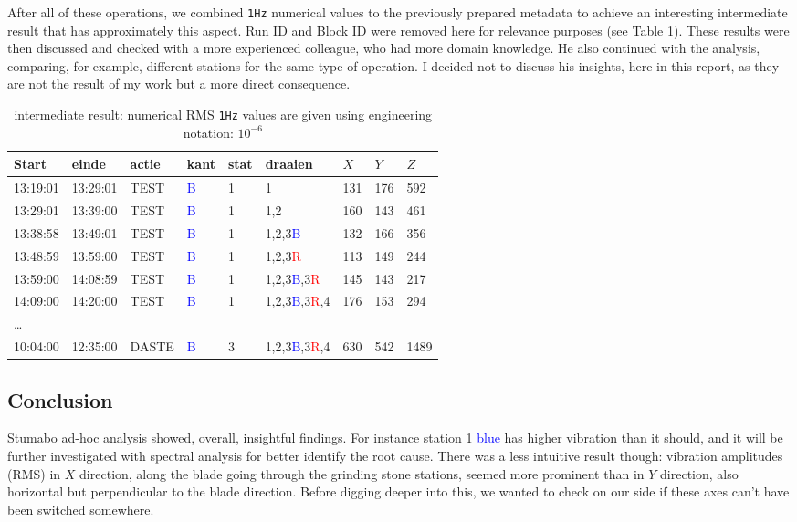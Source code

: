 After all of these operations, we combined \texttt{1Hz} numerical values to the previously prepared metadata to achieve an interesting intermediate result that has approximately this aspect. 
Run ID and Block ID were removed here for relevance purposes (see Table \ref{tab:stu_intermediate_res}).  
These results were then discussed and checked with a more experienced colleague, who had more domain knowledge. 
He also continued with the analysis, comparing, for example, different stations for the same type of operation. 
I decided not to discuss his insights, here in this report, as they are not the result of my work but a more direct consequence.
\begin{table}[ht]
    \centering
    \begin{tabularx}{\textwidth}{@{}lllllllll@{}}
    \toprule
    Start & einde & actie & kant & stat & draaien & $X$ & $Y$ & $Z$ \\ \midrule
    13:19:01 & 13:29:01 & TEST & \textcolor{blue}{B} & 1 & 1 & 131 & 176 & 592 \\ 
    13:29:01 & 13:39:00 & TEST & \textcolor{blue}{B} & 1 & 1,2 & 160 & 143 & 461 \\  
    13:38:58 & 13:49:01 & TEST & \textcolor{blue}{B} & 1 & 1,2,3\textcolor{blue}{B} & 132 & 166 & 356 \\ 
    13:48:59 & 13:59:00 & TEST & \textcolor{blue}{B} & 1 & 1,2,3\textcolor{red}{R} & 113 & 149 & 244  \\
    13:59:00 & 14:08:59 & TEST & \textcolor{blue}{B} & 1 & 1,2,3\textcolor{blue}{B},3\textcolor{red}{R} & 145 & 143 & 217 \\ 
    14:09:00 & 14:20:00 & TEST & \textcolor{blue}{B} & 1 & 1,2,3\textcolor{blue}{B},3\textcolor{red}{R},4 & 176 & 153 & 294 \\ 
    \dots \\
    10:04:00 & 12:35:00 & DASTE & \textcolor{blue}{B} & 3 & 1,2,3\textcolor{blue}{B},3\textcolor{red}{R},4 & 630 & 542 & 1489 \\
    \bottomrule
    \end{tabularx}
    \caption{intermediate result: numerical RMS \texttt{1Hz} values are given using engineering notation: $10^{-6}$}
    \label{tab:stu_intermediate_res}
\end{table}

\subsection{Conclusion}
Stumabo ad-hoc analysis showed, overall, insightful findings. For instance station 1 \textcolor{blue}{blue} has higher vibration than it should, 
and it will be further investigated with spectral analysis for better identify the root cause.
There was a less intuitive result though: vibration amplitudes (RMS) in $X$ direction, along the blade going through the grinding stone stations,
seemed more prominent than in $Y$ direction, also horizontal but perpendicular to the blade direction.
Before digging deeper into this, we wanted to check on our side if these axes can't have been switched somewhere.

